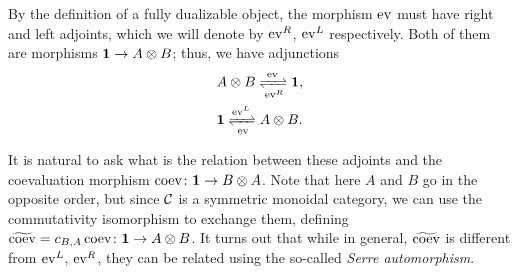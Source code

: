 By the definition of a fully dualizable object, the morphism $\operatorname{ev}$ must have right and
left adjoints, which we will denote by $\operatorname{ev}^R$, $\operatorname{ev}^L$ respectively. Both of
them are morphisms $\mathbf{1} \to A\otimes B$; thus, we have adjunctions
\begin{align*}
&A\otimes B \xrightleftharpoons[\ev^R]{\ev}\one,\\
&\one \xrightleftharpoons[\ev]{\ev^L}A \otimes B.
\end{align*}

It is natural to ask what is the relation between these adjoints and the
coevaluation morphism $\operatorname{coev}\colon \mathbf{1} \to B \otimes A$. Note that here $A$ and
$B$ go in the opposite order, but since $\mathcal{C}$ is a symmetric monoidal
category, we can use the commutativity isomorphism to exchange them, defining
$\widetilde{\operatorname{coev}} = c_{B,A}\operatorname{coev}\colon \mathbf{1} \to A\otimes B$. It turns out that
while in general, $\widetilde{\operatorname{coev}}$ is different from $\operatorname{ev}^L$, $\operatorname{ev}^R$, they can
be related using the so-called \emph{Serre automorphism}.

